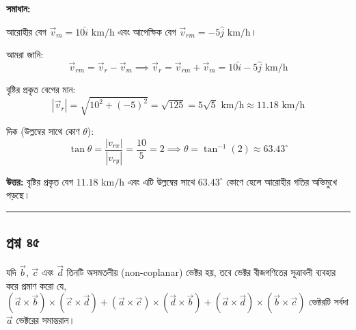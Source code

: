 \documentclass[11pt,a4paper]{article}
\begin{document}
\vspace{0.3cm}
\begin{center}
\end{center}

\textbf{সমাধান:}

আরোহীর বেগ $\vec{v}_m = 10\hat{i}\text{ km/h}$ এবং আপেক্ষিক বেগ $\vec{v}_{rm} = -5\hat{j}\text{ km/h}$।

আমরা জানি:
$$\vec{v}_{rm} = \vec{v}_r - \vec{v}_m \implies \vec{v}_r = \vec{v}_{rm} + \vec{v}_m = 10\hat{i} - 5\hat{j}\text{ km/h}$$

বৃষ্টির প্রকৃত বেগের মান:
$$|\vec{v}_r| = \sqrt{10^2 + (-5)^2} = \sqrt{125} = 5\sqrt{5}\text{ km/h} \approx 11.18\text{ km/h}$$

দিক (উল্লম্বের সাথে কোণ $\theta$):
$$\tan\theta = \frac{|v_{rx}|}{|v_{ry}|} = \frac{10}{5} = 2 \implies \theta = \tan^{-1}(2) \approx 63.43^\circ$$

\textbf{উত্তর:} বৃষ্টির প্রকৃত বেগ $11.18\text{ km/h}$ এবং এটি উল্লম্বের সাথে $63.43^\circ$ কোণে হেলে আরোহীর গতির অভিমুখে পড়ছে।

\vspace{0.5cm}
\hrule
\vspace{0.5cm}

\subsection*{প্রশ্ন ৪৫}

যদি $\vec{b}$, $\vec{c}$ এবং $\vec{d}$ তিনটি অসমতলীয় (non-coplanar) ভেক্টর হয়, তবে ভেক্টর বীজগণিতের সূত্রাবলী ব্যবহার করে প্রমাণ করো যে, $(\vec{a} \times \vec{b}) \times (\vec{c} \times \vec{d}) + (\vec{a} \times \vec{c}) \times (\vec{d} \times \vec{b}) + (\vec{a} \times \vec{d}) \times (\vec{b} \times \vec{c})$ ভেক্টরটি সর্বদা $\vec{a}$ ভেক্টরের সমান্তরাল।
\end{document}
